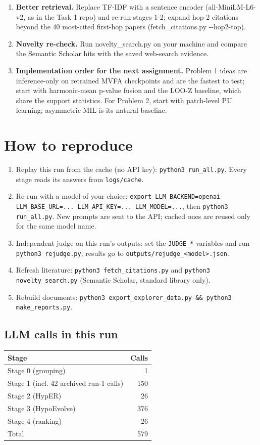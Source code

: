 \documentclass[11pt,a4paper]{article}
\begin{document}
\begin{enumerate}[leftmargin=1.6em]
\item \textbf{Better retrieval.} Replace TF-IDF with a sentence encoder (all-MiniLM-L6-v2, as in the Task 1 repo) and re-run stages 1-2; expand hop-2 citations beyond the 40 most-cited first-hop papers (fetch\_\allowbreak{}citations.py -{}-hop2-top).
\item \textbf{Novelty re-check.} Run novelty\_\allowbreak{}search.py on your machine and compare the Semantic Scholar hits with the saved web-search evidence.
\item \textbf{Implementation order for the next assignment.} Problem 1 ideas are inference-only on retrained MVFA checkpoints and are the fastest to test; start with harmonic-mean p-value fusion and the LOO-Z baseline, which share the support statistics. For Problem 2, start with patch-level PU learning; asymmetric MIL is its natural baseline.
\end{enumerate}
\section{How to reproduce}
\begin{enumerate}[leftmargin=1.6em]
\item Replay this run from the cache (no API key): \texttt{python3 run\_all.py}. Every stage reads its answers from \texttt{logs/cache}.
\item Re-run with a model of your choice: \texttt{export LLM\_BACKEND=openai LLM\_BASE\_URL=... LLM\_API\_KEY=... LLM\_MODEL=...}, then \texttt{python3 run\_all.py}. New prompts are sent to the API; cached ones are reused only for the same model name.
\item Independent judge on this run's outputs: set the \texttt{JUDGE\_*} variables and run \texttt{python3 rejudge.py}; results go to \texttt{outputs/rejudge\_<model>.json}.
\item Refresh literature: \texttt{python3 fetch\_citations.py} and \texttt{python3 novelty\_search.py} (Semantic Scholar, standard library only).
\item Rebuild documents: \texttt{python3 export\_explorer\_data.py \&\& python3 make\_reports.py}.
\end{enumerate}
\subsection*{LLM calls in this run}
\begin{tabular}{@{}l r@{}}\toprule Stage & Calls\\\midrule
Stage 0 (grouping) & 1\\
Stage 1 (incl. 42 archived run-1 calls) & 150\\
Stage 2 (HypER) & 26\\
Stage 3 (HypoEvolve) & 376\\
Stage 4 (ranking) & 26\\
\midrule Total & 579\\\bottomrule\end{tabular}
\end{document}
